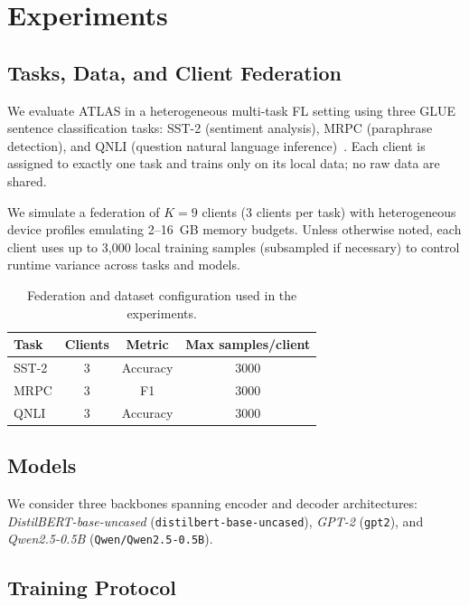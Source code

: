 \documentclass[conference]{IEEEtran}
\begin{document}
\section{Experiments}
\label{sec:experiments}

\subsection{Tasks, Data, and Client Federation}

We evaluate ATLAS in a heterogeneous multi-task FL setting using three GLUE sentence classification tasks: SST-2 (sentiment analysis), MRPC (paraphrase detection), and QNLI (question natural language inference)~\cite{glue}. Each client is assigned to exactly one task and trains only on its local data; no raw data are shared.

We simulate a federation of $K=9$ clients (3 clients per task) with heterogeneous device profiles emulating 2--16~GB memory budgets. Unless otherwise noted, each client uses up to 3{,}000 local training samples (subsampled if necessary) to control runtime variance across tasks and models.

\begin{table}[t]
\centering
\caption{Federation and dataset configuration used in the experiments.}
\label{tab:exp_federation_setup}
\begin{tabular}{lccc}
\toprule
\textbf{Task} & \textbf{Clients} & \textbf{Metric} & \textbf{Max samples/client} \\
\midrule
SST-2 & 3 & Accuracy & 3000 \\
MRPC & 3 & F1 & 3000 \\
QNLI & 3 & Accuracy & 3000 \\
\bottomrule
\end{tabular}
\end{table}

\subsection{Models}

We consider three backbones spanning encoder and decoder architectures: \textit{DistilBERT-base-uncased} (\texttt{distilbert-base-uncased}), \textit{GPT-2} (\texttt{gpt2}), and \textit{Qwen2.5-0.5B} (\texttt{Qwen/Qwen2.5-0.5B}).

\subsection{Training Protocol}
\end{document}
